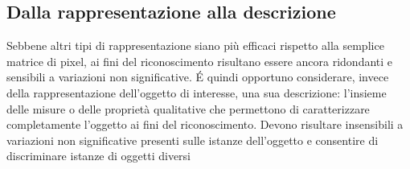\subsection{Dalla rappresentazione alla descrizione} Sebbene altri tipi di
rappresentazione siano più  efficaci rispetto alla semplice matrice di pixel,
ai  fini del riconoscimento risultano essere ancora  ridondanti e sensibili a
variazioni non  significative. \'{E} quindi opportuno considerare, invece della
rappresentazione dell'oggetto di interesse,  una sua descrizione: l'insieme delle misure o delle proprietà qualitative  che permettono di caratterizzare
completamente  l'oggetto ai fini del riconoscimento. Devono risultare insensibili a
variazioni non significative presenti  sulle istanze dell'oggetto e consentire
di discriminare istanze di oggetti diversi
